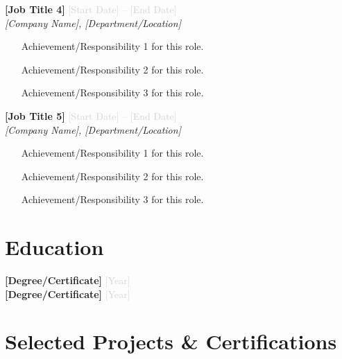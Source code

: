 \documentclass[11pt,a4paper]{article}
\begin{document}
\vspace{6pt}

\noindent\textbf{\large [Job Title 4]} \hfill \textcolor{lightgray}{[Start Date] -- [End Date]}\\
\textit{[Company Name], [Department/Location]}
\begin{itemize}
    \item [Achievement/Responsibility 1 for this role.]
    \item [Achievement/Responsibility 2 for this role.]
    \item [Achievement/Responsibility 3 for this role.]
\end{itemize}

\vspace{6pt}

\noindent\textbf{\large [Job Title 5]} \hfill \textcolor{lightgray}{[Start Date] -- [End Date]}\\
\textit{[Company Name], [Department/Location]}
\begin{itemize}
    \item [Achievement/Responsibility 1 for this role.]
    \item [Achievement/Responsibility 2 for this role.]
    \item [Achievement/Responsibility 3 for this role.]
\end{itemize}

\section*{Education}
\noindent\textbf{[Degree/Certificate]} \hfill \textcolor{lightgray}{[Year]}\\
\noindent\textbf{[Degree/Certificate]} \hfill \textcolor{lightgray}{[Year]}

\section*{Selected Projects \& Certifications}
\end{document}
